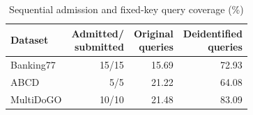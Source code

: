 \begin{table}[!htb]
\caption{Sequential admission and fixed-key query coverage (\%)}
\label{tab:sequential-admission}
\centering\footnotesize
\setlength{\tabcolsep}{3pt}
\renewcommand{\arraystretch}{1.00}
\begin{tabular*}{\columnwidth}{@{\extracolsep{\fill}}lrrr@{}}
\toprule
Dataset & \shortstack{Admitted/\\submitted} & \shortstack{Original\\queries} & \shortstack{Deidentified\\queries} \\
\midrule
Banking77 & 15/15 & 15.69 & 72.93 \\
ABCD & 5/5 & 21.22 & 64.08 \\
MultiDoGO & 10/10 & 21.48 & 83.09 \\
\bottomrule
\end{tabular*}
\par
\begin{minipage}{\columnwidth}\footnotesize
\end{minipage}
\end{table}
